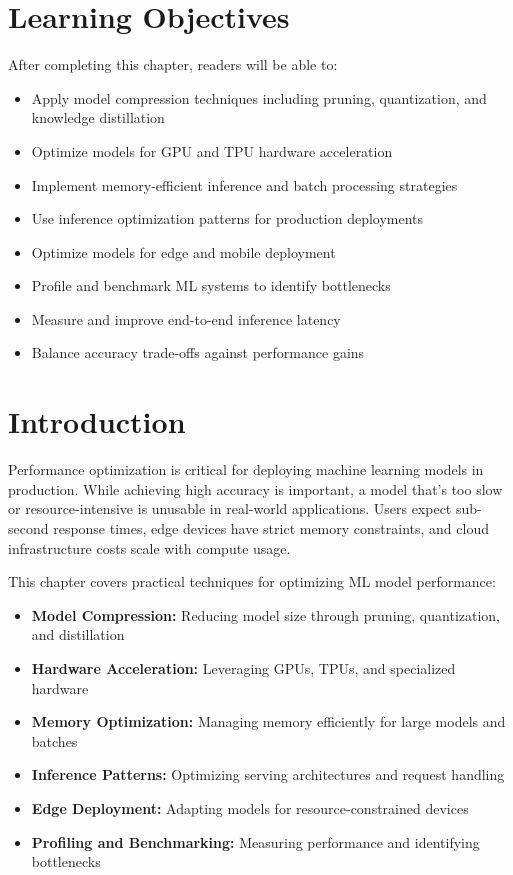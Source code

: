 \section{Learning Objectives}

After completing this chapter, readers will be able to:
\begin{itemize}
    \item Apply model compression techniques including pruning, quantization, and knowledge distillation
    \item Optimize models for GPU and TPU hardware acceleration
    \item Implement memory-efficient inference and batch processing strategies
    \item Use inference optimization patterns for production deployments
    \item Optimize models for edge and mobile deployment
    \item Profile and benchmark ML systems to identify bottlenecks
    \item Measure and improve end-to-end inference latency
    \item Balance accuracy trade-offs against performance gains
\end{itemize}

\section{Introduction}

Performance optimization is critical for deploying machine learning models in production. While achieving high accuracy is important, a model that's too slow or resource-intensive is unusable in real-world applications. Users expect sub-second response times, edge devices have strict memory constraints, and cloud infrastructure costs scale with compute usage.

This chapter covers practical techniques for optimizing ML model performance:

\begin{itemize}
    \item \textbf{Model Compression:} Reducing model size through pruning, quantization, and distillation
    \item \textbf{Hardware Acceleration:} Leveraging GPUs, TPUs, and specialized hardware
    \item \textbf{Memory Optimization:} Managing memory efficiently for large models and batches
    \item \textbf{Inference Patterns:} Optimizing serving architectures and request handling
    \item \textbf{Edge Deployment:} Adapting models for resource-constrained devices
    \item \textbf{Profiling and Benchmarking:} Measuring performance and identifying bottlenecks
\end{itemize}

